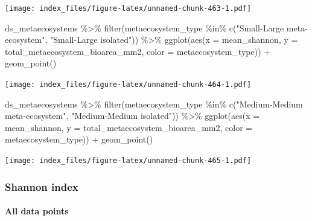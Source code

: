 \documentclass[
]{article}
\newenvironment{Shaded}{\begin{snugshade}}{\end{snugshade}}
\newcommand{\AttributeTok}[1]{\textcolor[rgb]{0.77,0.63,0.00}{#1}}
\newcommand{\FunctionTok}[1]{\textcolor[rgb]{0.00,0.00,0.00}{#1}}
\newcommand{\NormalTok}[1]{#1}
\newcommand{\SpecialCharTok}[1]{\textcolor[rgb]{0.00,0.00,0.00}{#1}}
\newcommand{\StringTok}[1]{\textcolor[rgb]{0.31,0.60,0.02}{#1}}
\begin{document}
\texttt{[image: index\_files/figure-latex/unnamed-chunk-463-1.pdf]}

\begin{Shaded}
\begin{Highlighting}[]
\NormalTok{ds\_metaecosystems }\SpecialCharTok{\%\textgreater{}\%}
  \FunctionTok{filter}\NormalTok{(metaecosystem\_type }\SpecialCharTok{\%in\%} \FunctionTok{c}\NormalTok{(}\StringTok{"Small{-}Large meta{-}ecosystem"}\NormalTok{,}
                                   \StringTok{"Small{-}Large isolated"}\NormalTok{)) }\SpecialCharTok{\%\textgreater{}\%}
  \FunctionTok{ggplot}\NormalTok{(}\FunctionTok{aes}\NormalTok{(}\AttributeTok{x =}\NormalTok{ mean\_shannon,}
             \AttributeTok{y =}\NormalTok{ total\_metaecosystem\_bioarea\_mm2,}
             \AttributeTok{color =}\NormalTok{ metaecosystem\_type)) }\SpecialCharTok{+}
  \FunctionTok{geom\_point}\NormalTok{()}
\end{Highlighting}
\end{Shaded}

\texttt{[image: index\_files/figure-latex/unnamed-chunk-464-1.pdf]}

\begin{Shaded}
\begin{Highlighting}[]
\NormalTok{ds\_metaecosystems }\SpecialCharTok{\%\textgreater{}\%}
  \FunctionTok{filter}\NormalTok{(metaecosystem\_type }\SpecialCharTok{\%in\%} \FunctionTok{c}\NormalTok{(}\StringTok{"Medium{-}Medium meta{-}ecosystem"}\NormalTok{,}
                                   \StringTok{"Medium{-}Medium isolated"}\NormalTok{)) }\SpecialCharTok{\%\textgreater{}\%}
  \FunctionTok{ggplot}\NormalTok{(}\FunctionTok{aes}\NormalTok{(}\AttributeTok{x =}\NormalTok{ mean\_shannon,}
             \AttributeTok{y =}\NormalTok{ total\_metaecosystem\_bioarea\_mm2,}
             \AttributeTok{color =}\NormalTok{ metaecosystem\_type)) }\SpecialCharTok{+}
  \FunctionTok{geom\_point}\NormalTok{()}
\end{Highlighting}
\end{Shaded}

\texttt{[image: index\_files/figure-latex/unnamed-chunk-465-1.pdf]}

\hypertarget{shannon-index}{%
\subsubsection{Shannon index}\label{shannon-index}}

\hypertarget{all-data-points-2}{%
\paragraph{All data points}\label{all-data-points-2}}
\end{document}
